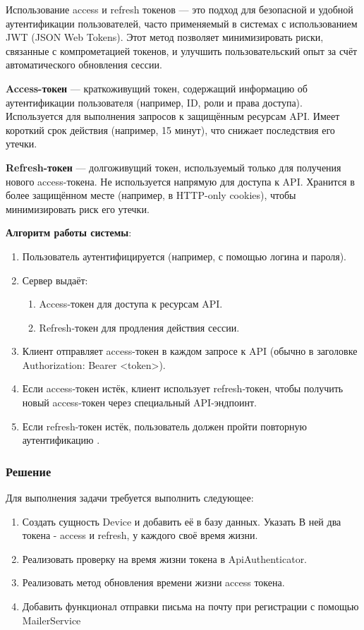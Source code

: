 \documentclass[pract]{SCWorks}
\begin{document}
Использование access и refresh токенов — это подход для безопасной и 
удобной аутентификации пользователей, часто применяемый в системах с 
использованием JWT (JSON Web Tokens). Этот метод позволяет минимизировать 
риски, связанные с компрометацией токенов, и улучшить пользовательский опыт 
за счёт автоматического обновления сессии.

\textbf{Access-токен} — краткоживущий токен, содержащий информацию об 
аутентификации пользователя (например, ID, роли и права доступа). Используется 
для выполнения запросов к защищённым ресурсам API. Имеет короткий срок действия
(например, 15 минут), что снижает последствия его утечки.

\textbf{Refresh-токен} — долгоживущий токен, используемый только для получения 
нового access-токена. Не используется напрямую для доступа к API. Хранится в 
более защищённом месте (например, в HTTP-only cookies), чтобы минимизировать 
риск его утечки.

\textbf{Алгоритм работы системы}:

\begin{enumerate}
    \item Пользователь аутентифицируется (например, с помощью логина и пароля).
    \item Сервер выдаёт:
    \begin{enumerate}
        \item Access-токен для доступа к ресурсам API.
        \item Refresh-токен для продления действия сессии.
    \end{enumerate}
    \item Клиент отправляет access-токен в каждом запросе к API 
    (обычно в заголовке Authorization: Bearer <token>).
    \item Если access-токен истёк, клиент использует refresh-токен, 
    чтобы получить новый access-токен через специальный API-эндпоинт.
    \item Если refresh-токен истёк, пользователь должен пройти повторную 
    аутентификацию \cite{baeldung_tokens} \cite{auth0_refresh_tokens}.
\end{enumerate}

\subsubsection{Решение}

Для выполнения задачи требуется выполнить следующее:

\begin{enumerate}
    \item Создать сущность Device и добавить её в базу данных. Указать В
    ней два токена - access и refresh, у каждого своё время жизни.
    \item Реализовать проверку на время жизни токена в ApiAuthenticator.
    \item Реализовать метод обновления времени жизни access токена.
    \item Добавить функционал отправки письма на почту при регистрации
    с помощью MailerService
\end{enumerate}
\end{document}
